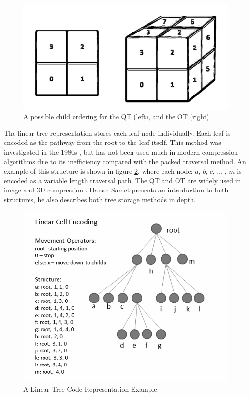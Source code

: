 \begin{figure}[!htb]
\centering
\includegraphics[width=12cm]{images/ch2/ChildOrderExample}
\caption{A possible child ordering for the QT (left), and the OT (right).}
\label{ChildOrderExample}
\end{figure}

The linear tree representation stores each leaf node individually. Each leaf is encoded as the pathway from the root to the leaf itself. This method was investigated in the 1980s \cite{Gargantini82Effective,Yufei88Octcodes}, but has not been used much in modern compression algorithms due to its inefficiency compared with the packed traversal method. An example of this structure is shown in figure \ref{LinearCellCodeRepresentation}, where each node: $a$, $b$, $c$, $\dots$ , $m$  is encoded as a variable length traversal path. The QT and OT are widely used in image \cite{Varma12Application} and 3D compression \cite{Schnabel06Octree}. Hanan Samet \cite{Samet88Fund1} presents an introduction to both structures, he also describes both tree storage methods in depth. 

\begin{figure}[!htb]
\centering
\includegraphics[width=12cm]{images/ch2/LinearCellCodeRepresentation}
\caption{A Linear Tree Code Representation Example}
\label{LinearCellCodeRepresentation}
\end{figure}



